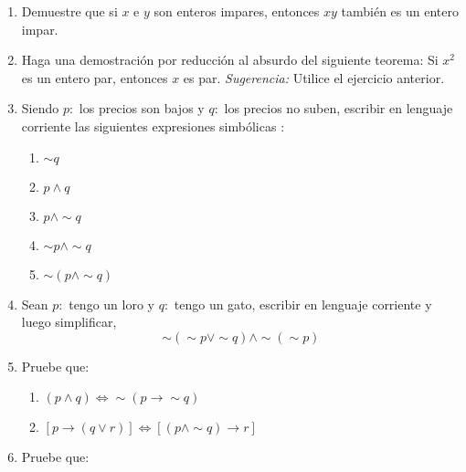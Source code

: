 {\begin{enumerate}
\begin{enumerate}
\begin{flushleft}
\par\end{flushleft}
\item \begin{flushleft}
$\begin{tabular}[t]{lll}
  &  \ensuremath{:} &  Dos rectas perpendiculares se \medskip\\
 &   &  intersecan. \medskip\\
 &  \ensuremath{:} &  Las rectas no son paralelas, si se \medskip\\
 &   &  intersecan.\medskip\\
\hline \medskip\mbox{}  &  \ensuremath{:} &  ........ 
\end{tabular}$ 
\par\end{flushleft}
\end{enumerate}
\item Demuestre que si $x$ e $y$ son enteros impares, entonces $xy$ también
es un entero impar.
\item Haga una demostración por reducción al absurdo del siguiente teorema:
Si $x^{2}$ es un entero par, entonces $x$ es par. \textit{Sugerencia:}
Utilice el ejercicio anterior.
\item Siendo $p:$ los precios son bajos y $q:$ los precios no suben, escribir
en lenguaje corriente las siguientes expresiones simbólicas : 

\begin{enumerate}
\item $\sim q$
\item $p\wedge q$
\item $p\wedge\sim q$
\item $\sim p\wedge\sim q$
\item $\sim\left(p\wedge\sim q\right)$
\end{enumerate}
\item Sean $p:$ tengo un loro y $q:$ tengo un gato, escribir en lenguaje
corriente y luego simplificar, 
\[
\sim\left(\sim p\vee\sim q\right)\wedge\sim\left(\sim p\right)
\]

\item Pruebe que: 

\begin{enumerate}
\item $\left(p\wedge q\right)\Leftrightarrow\sim\left(p\rightarrow\sim q\right)$
\item $\left[p\rightarrow\left(q\vee r\right)\right]\Leftrightarrow\left[\left(p\wedge\sim q\right)\rightarrow r\right]$
\end{enumerate}
\item Pruebe que: 


\end{enumerate}}
